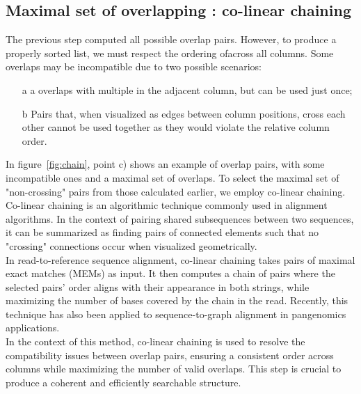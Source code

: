 \subsection{Maximal set of overlapping \kmers: co-linear chaining}
The previous step computed all possible \kmer overlap pairs. However, to produce a properly sorted list, we must respect the ordering of\kmers across all columns. Some overlaps may be incompatible due to two possible scenarios:
\begin{itemize}
	\item[a] a \kmer overlaps with multiple \kmers in the adjacent column, but can be used just once;
	\item[b] Pairs that, when visualized as edges between column positions, cross each other cannot be used together as they would violate the relative column order.
\end{itemize}
In figure~\ref{fig:chain}, point c) shows an example of overlap pairs, with some incompatible ones and a maximal set of overlaps. To select the maximal set of "non-crossing" pairs from those calculated earlier, we employ co-linear chaining.\\
Co-linear chaining is an algorithmic technique commonly used in alignment algorithms. In the context of pairing shared subsequences between two sequences, it can be summarized as finding pairs of connected elements such that no "crossing" connections occur when visualized geometrically. \\
In read-to-reference sequence alignment, co-linear chaining takes pairs of maximal exact matches (MEMs) as input. It then computes a chain of pairs where the selected pairs' order aligns with their appearance in both strings, while maximizing the number of bases covered by the chain in the read. Recently, this technique has also been applied to sequence-to-graph alignment in pangenomics applications.\\
In the context of this method, co-linear chaining is used to resolve the compatibility issues between \kmer overlap pairs, ensuring a consistent order across columns while maximizing the number of valid overlaps. This step is crucial to produce a coherent and efficiently searchable structure.

